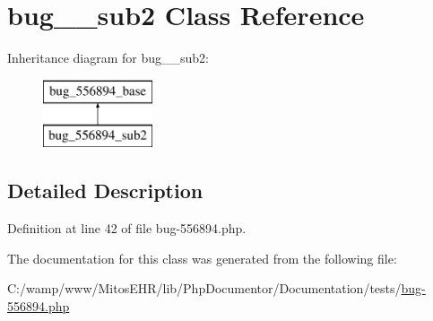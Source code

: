 \hypertarget{classbug__556894__sub2}{\section{bug\-\_\-\_\-sub2 \-Class \-Reference}
\label{classbug__556894__sub2}
}
\-Inheritance diagram for bug\-\_\-\_\-sub2\-:\begin{figure}[H]
\begin{center}
\leavevmode
\includegraphics[height=2.000000cm]{classbug__556894__sub2}
\end{center}
\end{figure}


\subsection{\-Detailed \-Description}


\-Definition at line 42 of file bug-\/556894.\-php.



\-The documentation for this class was generated from the following file\-:\begin{DoxyCompactItemize}
\item 
\-C\-:/wamp/www/\-Mitos\-E\-H\-R/lib/\-Php\-Documentor/\-Documentation/tests/\hyperlink{bug-556894_8php}{bug-\/556894.\-php}\end{DoxyCompactItemize}
